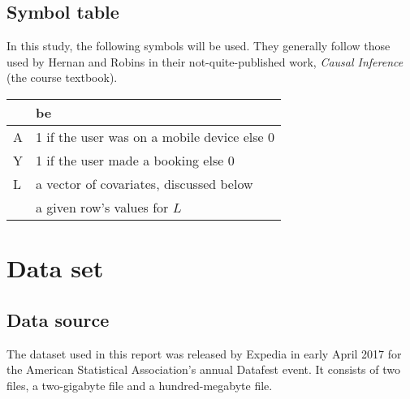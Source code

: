 \documentclass{article}
\begin{document}
\subsection{Symbol table}

In this study, the following symbols will be used.  They generally follow those
used by Hernan and Robins \cite{hernan2010causal} in their not-quite-published
work, \emph{Causal Inference} (the course textbook).

\begin{center}  
  \begin{tabular}{Ll}
     & be \\
    \hline
    A & 1 if the user was on a mobile device else 0 \\
    Y & 1 if the user made a booking else 0 \\
    L & a vector of covariates, discussed below \\
     & a given row's values for $L$\\
  \end{tabular}
\end{center}

\section{Data set} %

\subsection{Data source}

The dataset used in this report was released by Expedia in early April 2017 for
the American Statistical Association's annual Datafest event.  It consists of
two files, a two-gigabyte file and a hundred-megabyte file.
\end{document}
